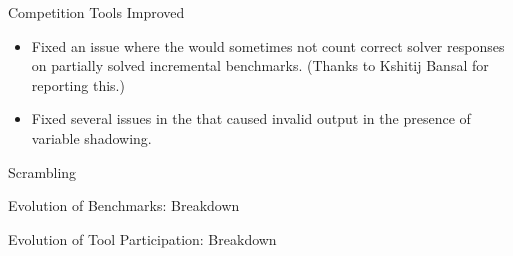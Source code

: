 \documentclass{beamer}
\begin{document}
\begin{frame}{Competition Tools Improved}
  \begin{itemize}
  \item Fixed an issue where the  would
    sometimes not count correct solver responses on partially solved
    incremental benchmarks. (Thanks to Kshitij Bansal for reporting
    this.)

    \bigskip

  \item Fixed several issues in the 
    that caused invalid output in the presence of variable shadowing.
  \end{itemize}

  \bigskip
\end{frame}

\logo{}


\begin{frame}{Scrambling}

\end{frame}



\begin{frame}{Evolution of Benchmarks: Breakdown}

\end{frame}


\begin{frame}{Evolution of Tool Participation: Breakdown}

\end{frame}

\end{document}
